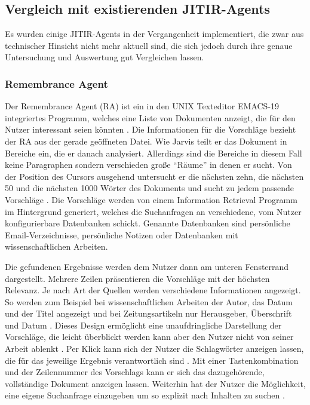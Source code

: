 \subsection{Vergleich mit existierenden JITIR-Agents}
Es wurden einige JITIR-Agents in der Vergangenheit implementiert, die zwar aus technischer Hinsicht nicht mehr aktuell sind, die sich jedoch durch ihre genaue Untersuchung und Auswertung gut Vergleichen lassen.

 	\subsubsection{Remembrance Agent}
 	Der Remembrance Agent (RA) ist ein in den UNIX Texteditor EMACS-19 integriertes Programm, welches eine Liste von Dokumenten anzeigt, die für den Nutzer interessant seien könnten \cite{rhodes1996remembrance}. Die Informationen für die Vorschläge bezieht der RA aus der gerade geöffneten Datei. Wie Jarvis teilt er das Dokument in Bereiche ein, die er danach analysiert. Allerdings sind die Bereiche in diesem Fall keine Paragraphen sondern verschieden große ``Räume'' in denen er sucht. Von der Position des Cursors ausgehend untersucht er die nächsten zehn, die nächsten 50 und die nächsten 1000 Wörter des Dokuments und sucht zu jedem passende Vorschläge \cite{rhodes1996remembrance}. Die Vorschläge werden von einem Information Retrieval Programm im Hintergrund generiert, welches die Suchanfragen an verschiedene, vom Nutzer konfigurierbare Datenbanken schickt. Genannte Datenbanken sind persönliche Email-Verzeichnisse, persönliche Notizen oder Datenbanken mit wissenschaftlichen Arbeiten.

 	Die gefundenen Ergebnisse werden dem Nutzer dann am unteren Fensterrand dargestellt. Mehrere Zeilen präsentieren die Vorschläge mit der höchsten Relevanz. Je nach Art der Quellen werden verschiedene Informationen angezeigt. So werden zum Beispiel bei wissenschaftlichen Arbeiten der Autor, das Datum und der Titel angezeigt und bei Zeitungsartikeln nur Herausgeber, Überschrift und Datum \cite{rhodes2000just}. Dieses Design ermöglicht eine unaufdringliche Darstellung der Vorschläge, die leicht überblickt werden kann aber den Nutzer nicht von seiner Arbeit ablenkt \cite{rhodes1996remembrance}. Per Klick kann sich der Nutzer die Schlagwörter anzeigen lassen, die für das jeweilige Ergebnis verantwortlich sind \cite{rhodes2000just}. Mit einer Tastenkombination und der Zeilennummer des Vorschlags kann er sich das dazugehörende, vollständige Dokument anzeigen lassen. Weiterhin hat der Nutzer die Möglichkeit, eine eigene Suchanfrage einzugeben um so explizit nach Inhalten zu suchen \cite{rhodes1996remembrance}.

